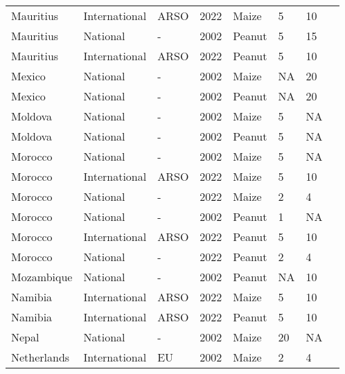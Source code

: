 \begin{landscape}
\begin{longtable}[c]{llllllll}
Mauritius         & International & ARSO     & 2022 & Maize  & 5  & 10 & \citet{ARSO2022}             \\
Mauritius         & National      & -        & 2002 & Peanut & 5  & 15 & \citet{van2004worldwide}     \\
Mauritius         & International & ARSO     & 2022 & Peanut & 5  & 10 & \citet{ARSO2022}             \\
Mexico            & National      & -        & 2002 & Maize  & NA & 20 & \citet{van2004worldwide}     \\
Mexico            & National      & -        & 2002 & Peanut & NA & 20 & \citet{van2004worldwide}     \\
Moldova           & National      & -        & 2002 & Maize  & 5  & NA & \citet{van2004worldwide}     \\
Moldova           & National      & -        & 2002 & Peanut & 5  & NA & \citet{van2004worldwide}     \\
Morocco           & National      & -        & 2002 & Maize  & 5  & NA & \citet{van2004worldwide}     \\
Morocco           & International & ARSO     & 2022 & Maize  & 5  & 10 & \citet{ARSO2022}             \\
Morocco           & National      & -        & 2022 & Maize  & 2  & 4  & \citet{chilaka2022mycotoxin} \\
Morocco           & National      & -        & 2002 & Peanut & 1  & NA & \citet{van2004worldwide}     \\
Morocco           & International & ARSO     & 2022 & Peanut & 5  & 10 & \citet{ARSO2022}             \\
Morocco           & National      & -        & 2022 & Peanut & 2  & 4  & \citet{chilaka2022mycotoxin} \\
Mozambique        & National      & -        & 2002 & Peanut & NA & 10 & \citet{van2004worldwide}     \\
Namibia           & International & ARSO     & 2022 & Maize  & 5  & 10 & \citet{ARSO2022}             \\
Namibia           & International & ARSO     & 2022 & Peanut & 5  & 10 & \citet{ARSO2022}             \\
Nepal             & National      & -        & 2002 & Maize  & 20 & NA & \citet{van2004worldwide}     \\
Netherlands       & International & EU       & 2002 & Maize  & 2  & 4  & \citet{EC2010}               \\

\end{longtable}
\end{landscape}
